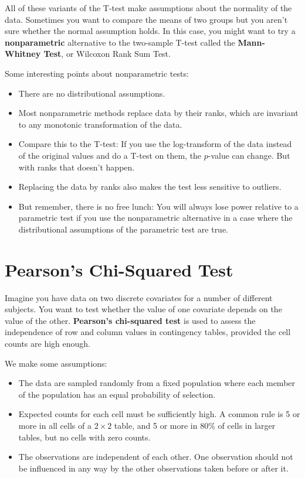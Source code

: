 All of these variants of the T-test make assumptions about the normality of the data. Sometimes you want to compare the means of two groups but you aren't sure whether the normal assumption holds. In this case, you might want to try a \textbf{nonparametric} alternative to the two-sample T-test called the \textbf{Mann-Whitney Test}, or Wilcoxon Rank Sum Test. 

Some interesting points about nonparametric tests:
\begin{itemize}
\item There are no distributional assumptions.
\item Most nonparametric methods replace data by their ranks, which are invariant to any monotonic transformation of the data.
\item Compare this to the T-test: If you use the log-transform of the data instead of the original values and do a T-test on them, the $p$-value can change. But with ranks that doesn't happen.
\item Replacing the data by ranks also makes the test less sensitive to outliers.
\item But remember, there is no free lunch: You will always lose power relative to a parametric test if you use the nonparametric alternative in a case where the distributional assumptions of the parametric test are true.
\end{itemize}


\section{Pearson's Chi-Squared Test}

Imagine you have data on two discrete covariates for a number of different subjects. You want to test whether the value of one covariate depends on the value of the other. \textbf{Pearson's chi-squared test} is used to assess the independence of row and column values in contingency tables, provided the cell counts are high enough.

We make some assumptions:
\begin{itemize}
\item The data are sampled randomly from a fixed population where each member of the population has an equal probability of selection.
\item Expected counts for each cell must be sufficiently high. A common rule is 5 or more in all cells of a $2\times 2$ table, and 5 or more in 80\% of cells in larger tables, but no cells with zero counts.
\item The observations are independent of each other. One observation should not be influenced in any way by the other observations taken before or after it.
\end{itemize}

